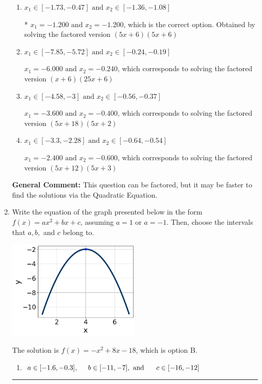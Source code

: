 \documentclass{extbook}[14pt]
\newcommand{\litem}[1]{\item #1

\rule{\textwidth}{0.4pt}}
\begin{document}
\begin{enumerate}
{\begin{enumerate}[label=\Alph*.]
$x_1 = -30.000 \text{ and } x_2 = -30.000$, which corresponds to solving the factored version $(x + 30)(x + 30)$
\item \( x_1 \in [-1.73, -0.47] \text{ and } x_2 \in [-1.36, -1.08] \)

* $x_1 = -1.200 \text{ and } x_2 = -1.200$, which is the correct option. Obtained by solving the factored version $(5x + 6)(5x + 6)$
\item \( x_1 \in [-7.85, -5.72] \text{ and } x_2 \in [-0.24, -0.19] \)

$x_1 = -6.000 \text{ and } x_2 = -0.240$, which corresponds to solving the factored version $(x + 6)(25x + 6)$
\item \( x_1 \in [-4.58, -3] \text{ and } x_2 \in [-0.56, -0.37] \)

$x_1 = -3.600 \text{ and } x_2 = -0.400$, which corresponds to solving the factored version $(5x + 18)(5x + 2)$
\item \( x_1 \in [-3.3, -2.28] \text{ and } x_2 \in [-0.64, -0.54] \)

$x_1 = -2.400 \text{ and } x_2 = -0.600$, which corresponds to solving the factored version $(5x + 12)(5x + 3)$
\end{enumerate}

\textbf{General Comment:} This question can be factored, but it may be faster to find the solutions via the Quadratic Equation.
}
\litem{
Write the equation of the graph presented below in the form $f(x)=ax^2+bx+c$, assuming  $a=1$ or $a=-1$. Then, choose the intervals that $a, b,$ and $c$ belong to.

\begin{center}
    \includegraphics[width=0.5\textwidth]{../Figures/quadraticGraphToEquationCopyB.png}
\end{center}


The solution is \( f(x) = -x^{2} +8 x -18 \), which is option B.\begin{enumerate}[label=\Alph*.]
\item \( a \in [-1.6, -0.3], \hspace*{5mm} b \in [-11, -7], \text{ and } \hspace*{5mm} c \in [-16, -12] \)


\end{enumerate}}
\end{enumerate}
\end{document}
